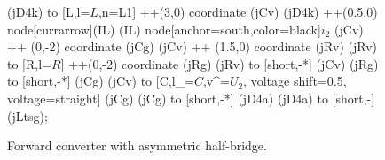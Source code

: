 \begin{figure}[ht]
\begin{center}
\begin{circuitikz}
                    (jD4k) to [L,l=$L$,n=L1] ++(3,0) coordinate (jCv)
                    (jD4k) ++(0.5,0) node[currarrow](IL){}  
                    (IL)  node[anchor=south,color=black]{$i_\mathrm{2}$}
                    (jCv) ++ (0,-2) coordinate (jCg)                    
                    (jCv) ++ (1.5,0) coordinate (jRv)                    
                    (jRv) to [R,l=$R$] ++(0,-2) coordinate (jRg)
                    (jRv)  to [short,-*] (jCv)
                    (jRg)  to [short,-*] (jCg)
                    (jCv) to  [C,l_=$C$,v^=$U_\text{2}$, voltage shift=0.5, voltage=straight] (jCg)
                    (jCg) to [short,-*] (jD4a)
                    (jD4a) to [short,-] (jLtsg);

                \end{circuitikz}
    \end{center}
    \caption{Forward converter with asymmetric half-bridge.}
    \label{fig:ex04_ForwardConverterWithAsymHalfBridge}
\end{figure}
